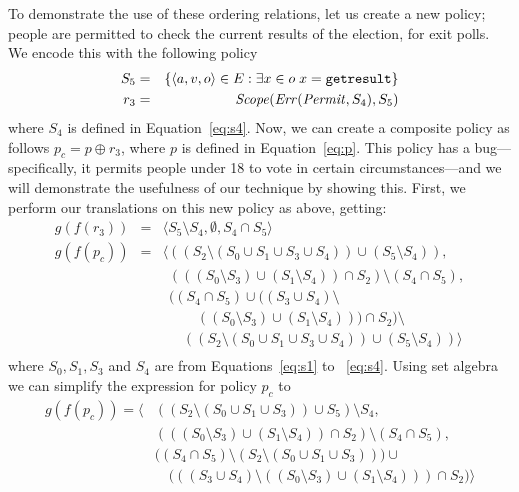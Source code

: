 To demonstrate the use of these ordering relations, 
let us create a new policy; people are permitted
to check the current results of the election, for exit polls.  
We encode this with the
following policy 
\begin{eqnarray*}
  S_5 & = & \{ \langle a, v, o \rangle \in E : 
  \exists x \in o \; x = \text{\texttt{getresult}} \} \\
  r_3 & = & \text{\textit{Scope}} (\text{\textit{Err}} (\text{\textit{Permit}}, S_4), S_5)
\end{eqnarray*}
where $S_4$ is defined in Equation~\eqref{eq:s4}.
Now, we can create a composite policy as follows $p_c = p \oplus r_3$,
where $p$ is defined in Equation~\eqref{eq:p}.  This
policy has a bug---specifically, it permits people under 18 to vote in
certain circumstances---and we will demonstrate the usefulness of our
technique by showing this.  First, we perform our translations on this
new policy as above, getting:
\begin{eqnarray*}
  g(f(r_3)) & = & \langle S_5 \setminus S_4, \emptyset, S_4 \cap S_5 \rangle \\
  g(f(p_c)) & = & \langle ((S_2 \setminus (S_0 \cup S_1 \cup S_3 \cup S_4)) 
  \cup (S_5 \setminus S_4)), \\
  & & \;\, (((S_0 \setminus S_3) \cup (S_1 \setminus S_4)) \cap S_2) 
  \setminus (S_4 \cap S_5), \\
  & & \;\, ((S_4 \cap S_5) \cup ((S_3 \cup S_4) \setminus \\
  & & \;\, \qquad ((S_0 \setminus S_3) \cup 
  (S_1 \setminus S_4))) \cap S_2) \setminus \\
  & & \;\, \quad ((S_2 \setminus (S_0 \cup S_1 \cup S_3 \cup S_4)) 
  \cup (S_5 \setminus S_4)) \rangle \\
\end{eqnarray*}
where $S_0,S_1, S_3$ and $S_4$ are from
Equations~\eqref{eq:s1} to ~\eqref{eq:s4}.
Using set algebra we can simplify the expression for policy $p_c$ to
\begin{align*}
  g(f(p_c)) = \big\langle & ((S_2 \setminus (S_0 \cup S_1 \cup S_3)) 
  \cup S_5) \setminus S_4, \\
  & (((S_0 \setminus S_3) \cup (S_1 \setminus S_4)) \cap S_2) 
  \setminus (S_4 \cap S_5), \\
  & \big((S_4 \cap S_5) \setminus (S_2 \setminus (S_0 \cup S_1 \cup S_3))\big)
  \cup \\
  & \quad \big(((S_3 \cup S_4) \setminus ((S_0 \setminus S_3) \cup
  (S_1 \setminus S_4))) \cap S_2 \big) \big\rangle
\end{align*}
